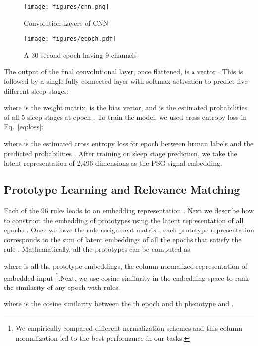 \documentclass[pmlr]{jmlr}
\begin{document}
\begin{figure*}
\begin{minipage}[c]{0.49\textwidth}
\centering
    \texttt{[image: figures/cnn.png]}
    \caption{Convolution Layers of CNN }
    \label{fig:cnn}
\end{minipage}
\begin{minipage}[c]{0.49\textwidth}
    \centering
    \texttt{[image: figures/epoch.pdf]}
    \caption{A 30 second epoch having 9 channels}
    \label{fig:epoch}
\end{minipage}
\end{figure*}

The output of the final convolutional layer, once flattened, is a vector . This is followed by a single fully connected layer with softmax activation to predict five different sleep stages:

where  is the weight matrix,  is the bias vector, and  is the estimated probabilities of all 5 sleep stages at epoch . To train the model, we used cross entropy loss in Eq.~\ref{eq:loss}:
 
where  is the estimated cross entropy loss for epoch  between human labels  and the predicted probabilities . After training on sleep stage prediction, we take the latent representation  of 2,496 dimensions as the PSG signal embedding. 

\subsection{Prototype Learning and Relevance Matching} \label{sec:prototype}
Each of the 96 rules leads to an embedding representation . 
Next we describe how to construct the embedding of prototypes using the latent representation of all epochs . 
Once we have the rule assignment matrix , each prototype representation  corresponds to the sum of latent embeddings of all the epochs that satisfy the rule . Mathematically, all the prototypes can be computed as 

where  is all the prototype embeddings,  the column normalized representation of embedded input \footnote{We empirically compared different normalization schemes and this column normalization led to the best performance in our tasks.}.Next, we use cosine similarity in the embedding space to rank the similarity of any epoch with rules.

where  is the cosine similarity between the th epoch and th phenotype and  .
\end{document}
